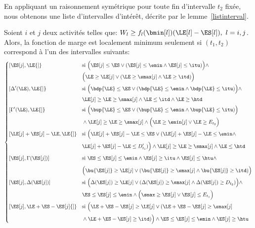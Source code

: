 En appliquant un raisonnement symétrique pour toute fin d'intervalle
$t_2$ fixée, nous obtenons une liste d'intervalles d'intérêt, décrite
par le lemme~\ref{listinterval}.

\begin{lemma}
  \label{listinterval} 
Soient $i$ et $j$ deux activités telles que: $W_l\ge
f_l(\bmin[l])(\LE[l]-\ES[l]),\ l=i,j$. Alors, la fonction de marge est
localement minimum seulement si $(t_1,t_2)$ correspond à l'un des
intervalles suivants:
\[ \left\{
    \begin{aligned} 
      &{[}\ES[j],\LE{]} & & \text{si } \Big(\ES[j] \le \ES \lor (\ES[j]
      \le \emin \land \ES[j] \le \itu)\Big) \land \\*
      & & &\Big(\LE \ge \LE[j] \lor (\LE \ge \smax[j] \land \LE \ge \itd)\Big)\\
      \rule[-0.8em]{0pt}{2em}      
      &{[}\Delta'(\LE),\LE{]} & & \text{si } \Big(\bdp{\LE} \le \ES \lor
      (\bdp{\LE}\le \emin \land \bdp{\LE}\le \itu)\Big) \land \\*
      & & &\LE[j] \ge \LE \ge \smax[j] \land \LE \le \itd \land \LE \ge
      \htd\\
      \rule[-0.8em]{0pt}{2em}
      &{[}\Gamma'(\LE),\LE{]} & & \text{si } \Big(\bup{\LE} \le \ES \lor
      (\bup{\LE} \le \emin \land \bup{\LE} \le \itu)\Big) \\*
      & & &\land \LE[j] \ge \LE \ge \smax[j] \land \Big(\LE \ge \emin[j]
      \lor \LE \ge E_{t_2}\Big)\\
      \rule[-0.8em]{0pt}{2em}
      &{[}\LE[j]+\ES[j]-\LE,\LE{]} & & \text{si } \Big(\LE[j]+\ES[j]-\LE \le \ES \lor
      (\LE[j]+\ES[j]-\LE \le \emin \land \\*
      & & & \LE[j]+\ES[j]-\LE \le D'_{t_1})\Big) \land \LE[j] \ge \LE
      \ge \smax[j] \land \LE\le \htd\\ 
      \rule[-0.8em]{0pt}{2em}
      &{[}\ES[j],\Gamma(\ES[j]){]} & &\text{si } \ES \le \ES[j] \le \emin \land
      \ES[j] \ge \itu \land \ES[j] \le \htu \land \\* 
      & & &\Big(\bu{\ES[j]} \ge \LE[j] \lor (\bu{\ES[j]} \ge \smax[j] \land \bu{\ES[j]} \ge
      \itd)\Big)\\
      \rule[-0.8em]{0pt}{2em}
      &{[}\ES[j],\Delta(\ES[j]){]} & &\text{si } \Big(\Delta(\ES[j]) \ge \LE[j] \lor
      (\Delta(\ES[j]) \ge \smax[j] \land \Delta(\ES[j]) \ge D_{t_2})\Big) \land
      \\* 
      & & &\ES \le \ES[j] \le \emin \land \Big(\smax \ge \ES[j] \lor \ES[j] \le
      E_{t_1}\Big)\\
      \rule[-0.8em]{0pt}{2em}
      &{[}\ES[j],\LE+\ES-\ES[j]{]} & & \text{si } \Big(\LE+\ES-\ES[j] \ge \LE[j] \lor
      (\LE+\ES-\ES[j] \ge \smax[j] \\*
& & &\land \LE+\ES-\ES[j] \ge \itd)\Big) \land 
      \ES \le \ES[j] \le \emin \land \ES[j] \ge \htu
    \end{aligned} \right.
\]
\end{lemma}

